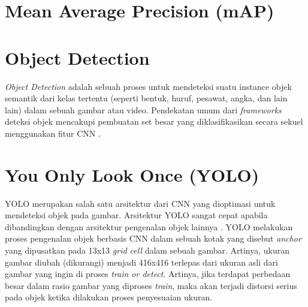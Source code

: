 \section{Mean Average Precision (mAP)}
\label{sec:meanaverageprecision}

\section{Object Detection}
\label{sec:objectdetection}
\textit{Object Detection} adalah sebuah proses untuk mendeteksi suatu instance objek semantik dari kelas tertentu (seperti bentuk, huruf, pesawat, angka, dan lain lain) dalam sebuah gambar atau video. Pendekatan umum dari  \textit{frameworks} deteksi objek mencakupi pembuatan set besar yang diklasifikasikan secara sekuel menggunakan fitur CNN \citep*{voulodimos2018deep}. \par


\section{You Only Look Once (YOLO)}
\label{sec:yolo}
YOLO merupakan salah satu arsitektur dari CNN yang dioptimasi untuk mendeteksi objek pada gambar. Arsitektur YOLO sangat cepat apabila dibandingkan dengan arsitektur pengenalan objek lainnya . YOLO melakukan proses pengenalan objek berbasis CNN dalam sebuah kotak yang disebut \textit{anchor} yang dipusatkan pada 13x13 \textit{grid cell} dalam sebuah gambar. Artinya, ukuran gambar diubah (dikurangi) menjadi 416x416 terlepas dari ukuran asli dari gambar yang ingin di proses \textit{train or detect}. Artinya, jika terdapat perbedaan besar dalam rasio gambar yang diproses \textit{train}, maka akan terjadi distorsi serius pada objek ketika dilakukan proses penyesuaian ukuran\citep*{jeong2018image}. \par


